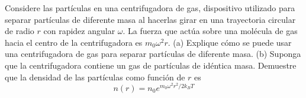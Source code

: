 \item Considere las partículas en una centrifugadora de gas, dispositivo utilizado para separar partículas de diferente masa al hacerlas girar en una trayectoria circular de radio $r$ con rapidez angular $\omega$. La fuerza que actúa sobre una molécula de gas hacia el centro de la centrifugadora es $m_0\omega^2r$. 
(a) Explique cómo se puede usar una centrifugadora de gas para separar partículas de diferente masa. 
(b) Suponga que la centrifugadora contiene un gas de partículas de idéntica masa. Demuestre que la densidad de las partículas como función de $r$ es
$$ n(r) = n_0 e^{m_0\omega^2r^2/2k_BT} $$
